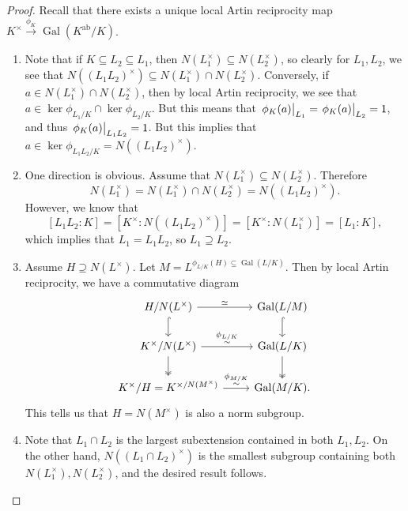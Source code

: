 \documentclass[leqno, openany]{memoir}
\theoremstyle{definition}
\theoremstyle{remark}
\theoremstyle{plain}
\theoremstyle{definition}
\theoremstyle{remark}
\newcommand{\mr}[1]{\mathrm{#1}}
\DeclareMathOperator{\Gal}{Gal}
\begin{document}
\begin{proof} Recall that there exists a unique local Artin reciprocity map
    $K^{\times} \xrightarrow{\phi_K} \Gal(K^{\mr{ab}}/K)$.  \begin{enumerate}
        \item Note that if $K \subseteq L_2 \subseteq L_1$, then
            $N(L_1^{\times}) \subseteq N(L_2^{\times})$, so clearly for $L_1,
            L_2$, we see that $N({(L_1L_2)}^{\times}) \subseteq N(L_1^{\times})
            \cap N(L_2^{\times})$. Conversely, if $a \in N(L_1^{\times}) \cap
            N(L_2^{\times})$, then by local Artin reciprocity, we see that $a
            \in \ker \phi_{L_1/K} \cap \ker \phi_{L_2/K}$. But this means that
            $\eval{\phi_K(a)}_{L_1} = \eval{\phi_K(a)}_{L_2} = 1$, and thus
            $\eval{\phi_K(a)}_{L_1L_2} = 1$. But this implies that $a \in \ker
            \phi_{L_1L_2/K} = N({(L_1L_2)}^{\times})$.  \item One direction is
            obvious. Assume that $N(L_1^{\times}) \subseteq N(L_2^{\times})$.
            Therefore \[ N(L_1^{\times}) = N(L_1^{\times}) \cap N(L_2^{\times})
            = N({(L_1L_2)}^{\times}). \] However, we know that \[ [L_1L_2:K] =
        [K^{\times}:N({(L_1L_2)}^{\times})] = [K^{\times}:N(L_1^{\times})] =
    [L_1:K], \] which implies that $L_1 = L_1L_2$, so $L_1 \supseteq L_2$.
\item Assume $H \supseteq N(L^{\times})$. Let $M = L^{\phi_{L/K}(H) \subseteq
    \Gal(L/K)}$. Then by local Artin reciprocity, we have a commutative diagram
    \begin{equation*} \begin{tikzcd} H/N(L^{\times}) \arrow{r}{\simeq}
        \arrow[hookrightarrow]{d} & \Gal(L/M) \arrow[hookrightarrow]{d} \\
        K^{\times}/N(L^{\times}) \arrow{r}{\substack{\phi_{L/K}\\ \sim}}
        \arrow[twoheadrightarrow]{d} & \Gal(L/K) \arrow[twoheadrightarrow]{d}
        \\ K^{\times}/H = K^{\times/N(M^{\times})}
    \arrow{r}{\substack{\phi_{M/K}\\ \sim}} & \Gal(M/K).  \end{tikzcd}
\end{equation*} This tells us that $H = N(M^{\times})$ is also a norm subgroup.
\item Note that $L_1 \cap L_2$ is the largest subextension contained in both
    $L_1, L_2$. On the other hand, $N({(L_1\cap L_2)}^{\times})$ is the
    smallest subgroup containing both $N(L_1^{\times}), N(L_2^{\times})$, and
    the desired result follows. \qedhere \end{enumerate} \end{proof}
\end{document}
